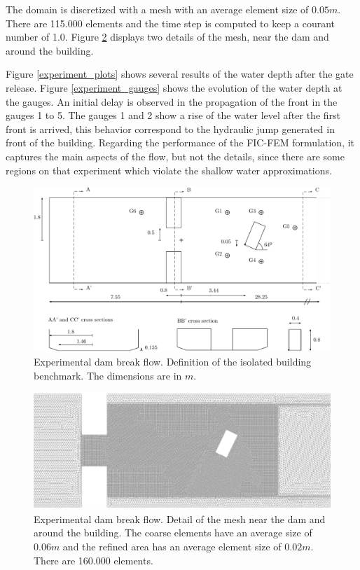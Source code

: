 \documentclass[a4paper,12pt]{elsarticle}
\begin{document}
The domain is discretized with a mesh with an average element size of $0.05m$. There are 115.000 elements and the time step is computed to keep a courant number of 1.0. Figure \ref{experiment_mesh} displays two details of the mesh, near the dam and around the building.

Figure \ref{experiment_plots} shows several results of the water depth after the gate release. Figure \ref{experiment_gauges} shows the evolution of the water depth at the gauges. An initial delay is observed in the propagation of the front in the gauges 1 to 5.
The gauges 1 and 2 show a rise of the water level after the first front is arrived, this behavior correspond to the hydraulic jump generated in front of the building.
Regarding the performance of the FIC-FEM formulation, it captures the main aspects of the flow, but not the details, since there are some regions on that experiment which violate the shallow water approximations.

\begin{figure}[H]
\centering
\includegraphics[width=\textwidth]{img/exp/sketch.pdf}
\caption{Experimental dam break flow. Definition of the isolated building benchmark. The dimensions are in $m$.}
\label{experiment_sketch}
\end{figure}


\begin{figure}[H]
\centering
\includegraphics[width=.8\textwidth]{img/exp/experiment_mesh.png}
\caption{Experimental dam break flow. Detail of the mesh near the dam and around the building. The coarse elements have an average size of $0.06m$ and the refined area has an average element size of $0.02m$. There are 160.000 elements.}
\label{experiment_mesh}
\end{figure}
\end{document}
